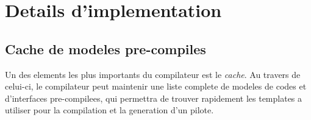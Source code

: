 \documentclass[french]{rtxreport}
\begin{document}
\chapter{Details d'implementation}



\section{Cache de modeles pre-compiles}

Un des elements les plus importants du compilateur est le \emph{cache}. Au
travers de celui-ci, le compilateur peut maintenir une liste complete de
modeles de codes et d'interfaces pre-compilees, qui permettra de trouver
rapidement les templates a utiliser pour la compilation et la generation d'un
pilote.
\end{document}
